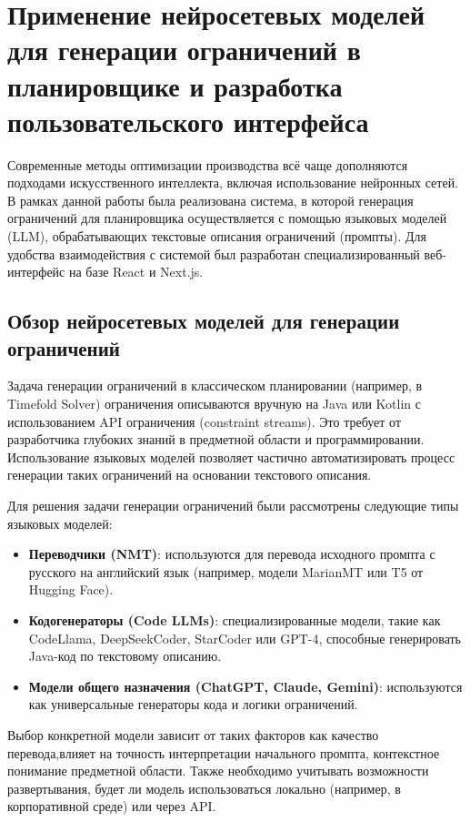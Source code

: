 \chapter{Применение нейросетевых моделей для генерации ограничений в планировщике и разработка пользовательского интерфейса}
\label{ch:chapter4}

Современные методы оптимизации производства всё чаще дополняются подходами искусственного интеллекта, включая использование нейронных сетей. В рамках данной работы была реализована система, в которой генерация ограничений для планировщика осуществляется с помощью языковых моделей (LLM), обрабатывающих текстовые описания ограничений (промпты). Для удобства взаимодействия с системой был разработан специализированный веб-интерфейс на базе React и Next.js.

\section{Обзор нейросетевых моделей для генерации ограничений}

Задача генерации ограничений в классическом планировании (например, в Timefold Solver) ограничения описываются вручную на Java или Kotlin с использованием API ограничения (constraint streams). Это требует от разработчика глубоких знаний в предметной области и программировании. Использование языковых моделей позволяет частично автоматизировать процесс генерации таких ограничений на основании текстового описания.

Для решения задачи генерации ограничений были рассмотрены следующие типы языковых моделей:

\begin{itemize}
    \item \textbf{Переводчики (NMT)}: используются для перевода исходного промпта с русского на английский язык (например, модели MarianMT или T5 от Hugging Face).
    \item \textbf{Кодогенераторы (Code LLMs)}: специализированные модели, такие как CodeLlama, DeepSeekCoder, StarCoder или GPT-4, способные генерировать Java-код по текстовому описанию.
    \item \textbf{Модели общего назначения (ChatGPT, Claude, Gemini)}: используются как универсальные генераторы кода и логики ограничений.
\end{itemize}

Выбор конкретной модели зависит от таких факторов как качество перевода,влияет на точность интерпретации начального промпта, контекстное понимание предметной области. Также необходимо учитывать возможности развертывания, будет ли модель использоваться локально (например, в корпоративной среде) или через API.

